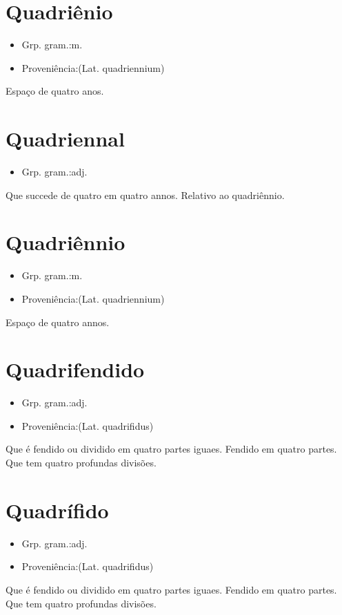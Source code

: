 \section{Quadriênio}
\begin{itemize}
\item {Grp. gram.:m.}
\end{itemize}
\begin{itemize}
\item {Proveniência:(Lat. \textunderscore quadriennium\textunderscore )}
\end{itemize}
Espaço de quatro anos.
\section{Quadriennal}
\begin{itemize}
\item {Grp. gram.:adj.}
\end{itemize}
Que succede de quatro em quatro annos.
Relativo ao quadriênnio.
\section{Quadriênnio}
\begin{itemize}
\item {Grp. gram.:m.}
\end{itemize}
\begin{itemize}
\item {Proveniência:(Lat. \textunderscore quadriennium\textunderscore )}
\end{itemize}
Espaço de quatro annos.
\section{Quadrifendido}
\begin{itemize}
\item {Grp. gram.:adj.}
\end{itemize}
\begin{itemize}
\item {Proveniência:(Lat. \textunderscore quadrifidus\textunderscore )}
\end{itemize}
Que é fendido ou dividido em quatro partes iguaes.
Fendido em quatro partes.
Que tem quatro profundas divisões.
\section{Quadrífido}
\begin{itemize}
\item {Grp. gram.:adj.}
\end{itemize}
\begin{itemize}
\item {Proveniência:(Lat. \textunderscore quadrifidus\textunderscore )}
\end{itemize}
Que é fendido ou dividido em quatro partes iguaes.
Fendido em quatro partes.
Que tem quatro profundas divisões.
